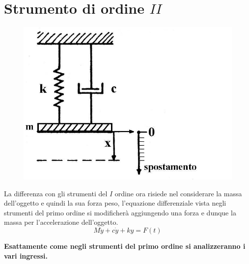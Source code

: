 \documentclass[a4paper, 15pt]{article}
\begin{document}
\section{Strumento di ordine $II$}	
\begin{adjustwidth}{2in}{}	 
	\begin{figure}[H]
		\centering
		\includegraphics[width=0.5\linewidth]{fig/imag4}
		\label{fig:imag4}
	\end{figure}
	La differenza con gli strumenti del $I$ ordine ora risiede nel considerare la massa dell'oggetto e quindi la sua forza peso, l'equazione differenziale vista negli strumenti del primo ordine si modificherà aggiungendo una forza e dunque la massa per l'accelerazione dell'oggetto. 
	\[ M\ddot{y} + c\dot{y} + ky = F(t)\]
	
	\begin{center}
		\textbf{Esattamente come negli strumenti del primo ordine si analizzeranno i vari ingressi.}
	\end{center}  
\end{adjustwidth}
\end{document}
